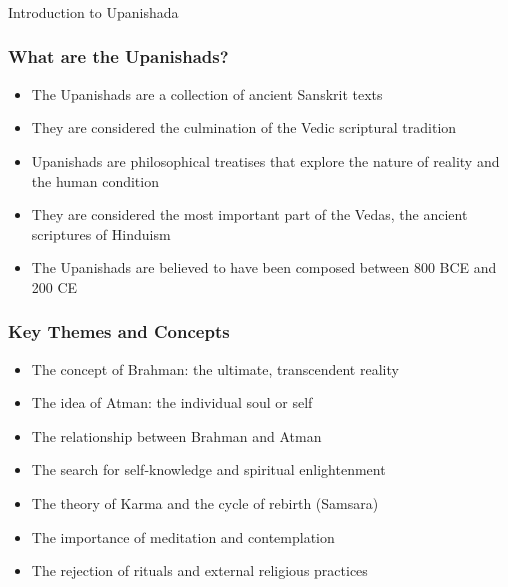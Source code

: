 \begin{frame}[fragile]\frametitle{}
\begin{center}
{\Large Introduction to Upanishada}
\end{center}
\end{frame}

\begin{frame}[fragile]\frametitle{What are the Upanishads?}
    \begin{itemize}
        \item The Upanishads are a collection of ancient Sanskrit texts
        \item They are considered the culmination of the Vedic scriptural tradition
        \item Upanishads are philosophical treatises that explore the nature of reality and the human condition
        \item They are considered the most important part of the Vedas, the ancient scriptures of Hinduism
        \item The Upanishads are believed to have been composed between 800 BCE and 200 CE
    \end{itemize}
\end{frame}

\begin{frame}[fragile]\frametitle{Key Themes and Concepts}
    \begin{itemize}
        \item The concept of Brahman: the ultimate, transcendent reality
        \item The idea of Atman: the individual soul or self
        \item The relationship between Brahman and Atman
        \item The search for self-knowledge and spiritual enlightenment
        \item The theory of Karma and the cycle of rebirth (Samsara)
        \item The importance of meditation and contemplation
        \item The rejection of rituals and external religious practices
    \end{itemize}
\end{frame}

